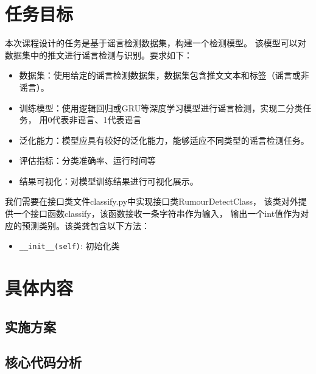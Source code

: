 \chapter{任务目标}

本次课程设计的任务是基于谣言检测数据集，构建一个检测模型。
该模型可以对数据集中的推文进行谣言检测与识别。要求如下：
\begin{itemize}
    \item 数据集：使用给定的谣言检测数据集，数据集包含推文文本和标签（谣言或非谣言）。
    \item 训练模型：使用逻辑回归或GRU等深度学习模型进行谣言检测，实现二分类任务，
    用0代表非谣言、1代表谣言
    \item 泛化能力：模型应具有较好的泛化能力，能够适应不同类型的谣言检测任务。
    \item 评估指标：分类准确率、运行时间等
    \item 结果可视化：对模型训练结果进行可视化展示。
\end{itemize}

\vspace{1em}

我们需要在接口类文件classify.py中实现接口类RumourDetectClass，
该类对外提供一个接口函数classify，该函数接收一条字符串作为输入，
输出一个int值作为对应的预测类别。该类龚包含以下方法：
\begin{itemize}
    \item \texttt{\_\_init\_\_(self)}: 初始化类
\end{itemize}

\chapter{具体内容}

\section{实施方案}


\section{核心代码分析}

